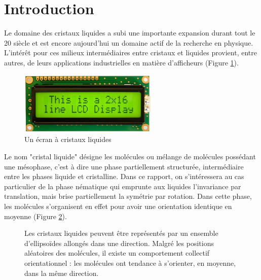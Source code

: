 \documentclass[11pt,a4paper]{article}
\numberwithin{equation}{section}
\begin{document}
\newpage

\tableofcontents


\newpage
\renewcommand\thepage{\arabic{page}}



\section*{Introduction}
Le domaine des cristaux liquides a subi une importante expansion durant tout le 20 siècle et est encore aujourd'hui un domaine actif de la recherche en physique. L'intérêt pour ces milieux intermédiaires entre cristaux et liquides provient, entre autres, de leurs applications industrielles en matière d'afficheurs (Figure \ref{lcd_photo}).

\begin{figure}[h]
    \centering	    
	\includegraphics[height=3cm]{figures/lcd.jpg}
    \caption{Un écran à cristaux liquides}
    	\label{lcd_photo} 
\end{figure}

Le nom "cristal liquide" désigne les molécules ou mélange de molécules possédant une mésophase, c'est à dire une phase partiellement structurée, intermédiaire entre les phases liquide et cristalline. Dans ce rapport, on s'intéressera au cas particulier de la phase nématique qui emprunte aux liquides l'invariance par translation, mais brise partiellement la symétrie par rotation. Dans cette phase, les molécules s'organisent en effet pour avoir une orientation identique en moyenne (Figure \ref{nematic_phase}).

\begin{figure}[h]
    \center
    
    \caption{Les cristaux liquides peuvent être représentés par un ensemble d'ellipsoïdes allongés dans une direction.
    Malgré les positions aléatoires des molécules, il existe un comportement collectif orientationnel : les molécules ont tendance à s'orienter, en moyenne, dans la même direction. }
    \label{nematic_phase}
\end{figure}
\end{document}
